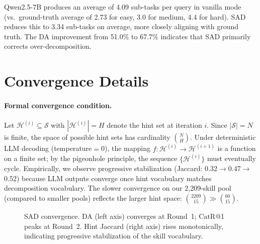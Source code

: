 \documentclass[11pt]{article}
\newcommand{\catrecall}{\text{CatR}}
\begin{document}
Qwen2.5-7B produces an average of 4.09 sub-tasks per query in vanilla mode (vs.\ ground-truth average of 2.73 for easy, 3.0 for medium, 4.4 for hard).
SAD reduces this to 3.34 sub-tasks on average, more closely aligning with ground truth.
The DA improvement from 51.0\% to 67.7\% indicates that SAD primarily corrects over-decomposition.


\section{Convergence Details}
\label{app:convergence}

\paragraph{Formal convergence condition.}
Let $\mathcal{H}^{(i)} \subseteq \mathcal{S}$ with $|\mathcal{H}^{(i)}| = H$ denote the hint set at iteration $i$.
Since $|\mathcal{S}| = N$ is finite, the space of possible hint sets has cardinality $\binom{N}{H}$.
Under deterministic LLM decoding (temperature$=$0), the mapping $f: \mathcal{H}^{(i)} \to \mathcal{H}^{(i+1)}$ is a function on a finite set; by the pigeonhole principle, the sequence $\{\mathcal{H}^{(i)}\}$ must eventually cycle.
Empirically, we observe progressive stabilization (Jaccard: 0.32$\to$0.47$\to$0.52) because LLM outputs converge once hint vocabulary matches decomposition vocabulary.
The slower convergence on our 2{,}209-skill pool (compared to smaller pools) reflects the larger hint space: $\binom{2209}{15} \gg \binom{60}{15}$.

\begin{figure}[h]
\centering
{}
\caption{SAD convergence. DA (left axis) converges at Round~1; $\catrecall$@1 peaks at Round~2. Hint Jaccard (right axis) rises monotonically, indicating progressive stabilization of the skill vocabulary.}
\label{fig:convergence}
\end{figure}
\end{document}
